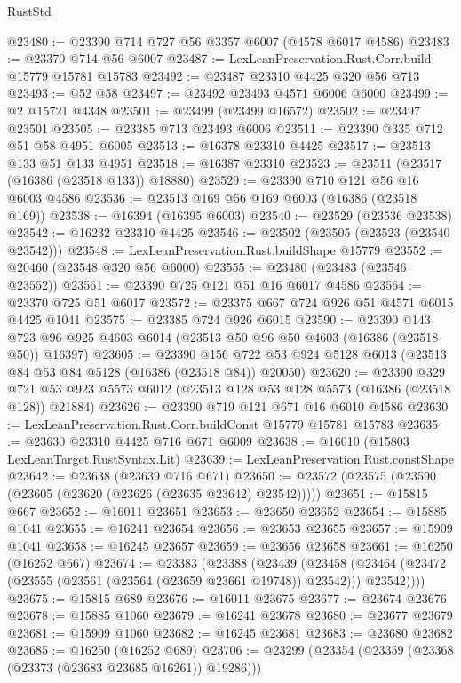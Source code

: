 \begin{lexlean}{RustStd}
\begin{coremodule}
@23480 := @23390 @714 @727 @56 @3357 @6007 (@4578 @6017 @4586)
@23483 := @23370 @714 @56 @6007
@23487 := LexLeanPreservation.Rust.Corr.build @15779 @15781 @15783
@23492 := @23487 @23310 @4425 @320 @56 @713
@23493 := @52 @58
@23497 := @23492 @23493 @4571 @6006 @6000
@23499 := @2 @15721 @4348
@23501 := @23499 (@23499 @16572)
@23502 := @23497 @23501
@23505 := @23385 @713 @23493 @6006
@23511 := @23390 @335 @712 @51 @58 @4951 @6005
@23513 := @16378 @23310 @4425
@23517 := @23513 @133 @51 @133 @4951
@23518 := @16387 @23310
@23523 := @23511 (@23517 (@16386 (@23518 @133)) @18880)
@23529 := @23390 @710 @121 @56 @16 @6003 @4586
@23536 := @23513 @169 @56 @169 @6003 (@16386 (@23518 @169))
@23538 := @16394 (@16395 @6003)
@23540 := @23529 (@23536 @23538)
@23542 := @16232 @23310 @4425
@23546 := @23502 (@23505 (@23523 (@23540 @23542)))
@23548 := LexLeanPreservation.Rust.buildShape @15779
@23552 := @20460 (@23548 @320 @56 @6000)
@23555 := @23480 (@23483 (@23546 @23552))
@23561 := @23390 @725 @121 @51 @16 @6017 @4586
@23564 := @23370 @725 @51 @6017
@23572 := @23375 @667 @724 @926 @51 @4571 @6015 @4425 @1041
@23575 := @23385 @724 @926 @6015
@23590 := @23390
    @143
    @723
    @96
    @925
    @4603
    @6014
    (@23513 @50 @96 @50 @4603 (@16386 (@23518 @50)) @16397)
@23605 := @23390
    @156
    @722
    @53
    @924
    @5128
    @6013
    (@23513 @84 @53 @84 @5128 (@16386 (@23518 @84)) @20050)
@23620 := @23390
    @329
    @721
    @53
    @923
    @5573
    @6012
    (@23513 @128 @53 @128 @5573 (@16386 (@23518 @128)) @21884)
@23626 := @23390 @719 @121 @671 @16 @6010 @4586
@23630 := LexLeanPreservation.Rust.Corr.buildConst @15779 @15781 @15783
@23635 := @23630 @23310 @4425 @716 @671 @6009
@23638 := @16010 (@15803 LexLeanTarget.RustSyntax.Lit)
@23639 := LexLeanPreservation.Rust.constShape
@23642 := @23638 (@23639 @716 @671)
@23650 := @23572 (@23575 (@23590 (@23605 (@23620 (@23626 (@23635 @23642) @23542)))))
@23651 := @15815 @667
@23652 := @16011 @23651
@23653 := @23650 @23652
@23654 := @15885 @1041
@23655 := @16241 @23654
@23656 := @23653 @23655
@23657 := @15909 @1041
@23658 := @16245 @23657
@23659 := @23656 @23658
@23661 := @16250 (@16252 @667)
@23674 := @23383
    (@23388
      (@23439
        (@23458 (@23464 (@23472 (@23555 (@23561 (@23564 (@23659 @23661 @19748)) @23542))) @23542))))
@23675 := @15815 @689
@23676 := @16011 @23675
@23677 := @23674 @23676
@23678 := @15885 @1060
@23679 := @16241 @23678
@23680 := @23677 @23679
@23681 := @15909 @1060
@23682 := @16245 @23681
@23683 := @23680 @23682
@23685 := @16250 (@16252 @689)
@23706 := @23299
    (@23354 (@23359 (@23368 (@23373 (@23683 @23685 @16261)) @19286)))

\end{coremodule}
\end{lexlean}
